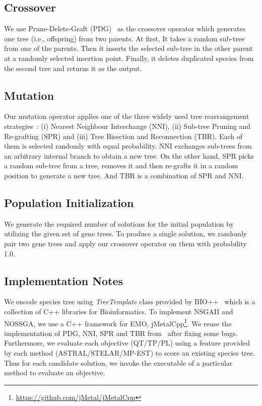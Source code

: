 \subsection{Crossover}\label{subsec:crossver}
We use Prune-Delete-Graft (PDG)~\cite{villalobos2018memetic} as the crossover operator which generates one tree (i.e., offspring) from two parents. At first, It takes a random sub-tree from one of the parents. Then it inserts the selected sub-tree in the other parent at a
randomly selected insertion point. Finally, it deletes duplicated species from the second tree and returns it as the output.

\subsection{Mutation} \label{subsec:mutation}
Our mutation operator applies one of the three widely used tree rearrangement strategies~\cite{felsenstein2004inferring}: (i) Nearest Neighbour
Interchange (NNI), (ii) Sub-tree Pruning and Re-grafting (SPR) and (iii) Tree Bisection and Reconnection (TBR). Each of them is selected randomly with equal probability. NNI exchanges sub-trees from an arbitrary internal branch to obtain a new tree. On the other hand, SPR picks a random sub-tree from a tree, removes it and then re-grafts it in a random position to generate a new tree. And TBR is a combination of SPR and NNI.

\subsection{Population Initialization}\label{subsec:init}
We generate the required number of solutions for the initial population by utilizing the given set of gene trees. To produce a single solution, we randomly pair two gene trees and apply our crossover operator on them with probability 1.0. 


\subsection{Implementation Notes}
We encode species tree using \textit{TreeTemplate} class provided by BIO++~\cite{gueguen2013bpp} which is a collection of C++ libraries for Bioinformatics. To implement NSGAII and NOSSGA, we use a C++ framework for EMO, jMetalCpp\footnote{\url{https://github.com/jMetal/jMetalCpp}}. We reuse the implementation of PDG, NNI, SPR and TBR from~\cite{zambrano2016mo} after fixing some bugs. Furthermore, we evaluate each objective (QT/TP/PL) using a feature provided by each method (ASTRAL/STELAR/MP-EST) to score an existing species tree. Thus for each candidate solution, we invoke the executable of a particular method to evaluate an objective.


